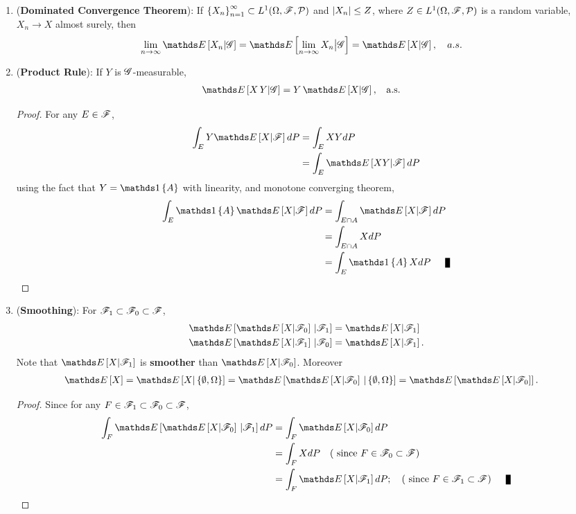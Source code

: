 \documentclass[11pt]{article}
\begin{document}
\begin{itemize}
\begin{proposition}
\begin{enumerate}
\item  (\textbf{Dominated Convergence Theorem}):  If  $\left\{X_n\right\}_{n=1}^{\infty} \subset  L^{1}(\Omega, {\mathscr F}, {\mathcal P})$ and $\left\lvert X_n \right\rvert \le Z$, where $Z \in L^{1}(\Omega, {\mathscr F}, {\mathcal P})$ is a random variable, $X_n \rightarrow X$ almost surely,  then
\begin{align*}
\lim\limits_{n\rightarrow \infty}\E{}{X_n | \srG} &= \E{}{\lim\limits_{n\rightarrow \infty} X_n \big| \srG} = \E{}{X | \srG}, \quad a.s.
\end{align*}
\item (\textbf{Product Rule}): If $Y$ is ${\mathscr G}$-measurable, 
\begin{align*}
\E{}{X\,Y | \srG} &= Y\,\E{}{X | \srG},\;\; \text{ a.s.}
\end{align*}
\begin{proof}
For any $E\in {\mathscr F}$,
\begin{align*}
\int_{E} Y\E{}{X|\srF} dP &= \int_{E} XY dP\\
&= \int_{E} \E{}{XY|\srF} dP
\end{align*}
using the fact that $Y= \ind{A}$ with linearity, and monotone converging theorem, 
\begin{align*}
\int_{E} \ind{A}\E{}{X|\srF} dP &= \int_{E\cap A} \E{}{X|\srF} dP\\
&= \int_{E\cap A} XdP\\
&= \int_{E} \ind{A}X dP \qed
\end{align*} 
\end{proof}

\item (\textbf{Smoothing}): For ${\mathscr F}_{1}\subset {\mathscr F}_{0} \subset {\mathscr F}$, 
\begin{align*}
\E{}{\E{}{X| \srF_{0}}\,|\srF_{1} } &= \E{}{X| \srF_{1}}\\
\E{}{\E{}{X| \srF_{1}}\,|\srF_{0} } &= \E{}{X| \srF_{1}}.
\end{align*} Note that $ \E{}{X| \srF_{1}}$ is \textbf{smoother} than $ \E{}{X| \srF_{0}}$.
Moreover
\begin{align*}
\E{}{X} = \E{}{X| \set{\emptyset, \Omega}} &= \E{}{\E{}{X| \srF_{0}}\,|\set{\emptyset, \Omega} } = \E{}{\E{}{X| \srF_{0}}}.
\end{align*}
\begin{proof}
Since for any $F\in {\mathscr F}_{1}\subset {\mathscr F}_{0} \subset {\mathscr F}$,
\begin{align*}
\int_{F}\E{}{\E{}{X| \srF_{0}}\,|\srF_{1} }dP &= \int_{F}\E{}{X| \srF_{0}} dP\\
&= \int_{F}XdP \quad ( \text{ since } F\in \srF_{0} \subset \srF)\\
&=  \int_{F}\E{}{X| \srF_{1}}dP; \quad ( \text{ since } F\in \srF_{1} \subset \srF) \qed
\end{align*}
\end{proof}


\end{enumerate}
\end{proposition}
\end{itemize}
\end{document}

